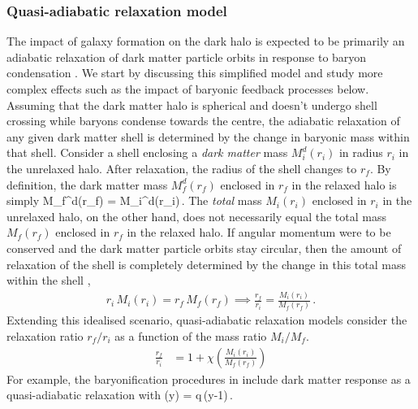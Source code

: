 \subsubsection{Quasi-adiabatic relaxation model}
\label{sec:methods-adiab-ch:z0main}
The impact of galaxy formation on the dark halo is expected to be primarily an adiabatic relaxation of dark matter particle orbits in response to baryon condensation \citep[][]{1986ApJ...301...27B}. We start by discussing this simplified model and study more complex effects such as the impact of baryonic feedback processes below.
Assuming that the dark matter halo is spherical and doesn't undergo shell crossing while baryons condense towards the centre, the adiabatic relaxation of any given dark matter shell is determined by the change in baryonic mass within that shell. 
Consider a shell enclosing a \emph{dark matter} mass $M_i^d(r_i)$ in radius $r_i$ in the unrelaxed halo. After relaxation, the radius of the shell changes to $r_f$. By definition, the dark matter mass $M_f^d(r_f)$ enclosed in $r_f$ in the relaxed halo is simply
\be 
M_f^d(r_f) = M_i^d(r_i)\,.
\label{eq:DMmass1-ch:z0main}
\ee
The \emph{total} mass $M_i(r_i)$ enclosed in $r_i$ in the unrelaxed halo, on the other hand, does not necessarily equal the total mass $M_f(r_f)$ enclosed in $r_f$ in the relaxed halo.
If angular momentum were to be conserved and the dark matter particle orbits stay circular, then the amount of relaxation of the shell is completely determined by the change in this total mass within the shell
\citep[][]{1986ApJ...301...27B},
\begin{align}
    r_i \,M_i(r_i) = r_f \,M_f(r_f) %
    \implies 
\frac{r_f}{r_i} = \frac{M_i(r_i)}{M_f(r_f)}\,. 
\label{eq:AR1-ch:z0main}
\end{align}
Extending this idealised scenario, quasi-adiabatic relaxation models consider the relaxation ratio $r_f/r_i$ as a function of the mass ratio $M_i/M_f$.
\begin{align}
\frac{r_f}{r_i} &= 1 + \chi \left( \frac{M_i(r_i)}{M_f(r_f)} \right) 
\label{eq:qAR1-ch:z0main}
\end{align}
For example, the baryonification procedures in \cite{2015JCAP...12..049S,2021MNRAS.503.4147P} include dark matter response as a quasi-adiabatic relaxation with
\be
\chi(y) = q\,(y-1)\,.
\label{eq:chi-linear-ch:z0main}
\ee

